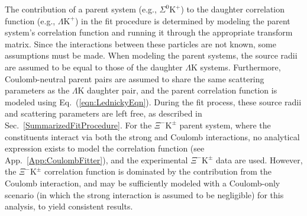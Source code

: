 \documentclass[ALICE,manyauthors]{cernphprep}
\newcommand{\KchP}{$\mathrm{K^{+}}$\xspace}
\newcommand{\LamK}{$\Lambda$K\xspace}
\newcommand{\LamKchP}{$\Lambda\mathrm{K^{+}}$\xspace}
\newcommand{\XiKpm}{$\Xi^{-}\mathrm{K^{\pm}}$\xspace}
\begin{document}
The contribution of a parent system (e.g., $\Sigma^{0}$\KchP) to the daughter correlation function (e.g., \LamKchP) in the fit procedure is determined by modeling the parent system's correlation function and running it through the appropriate transform matrix.
Since the interactions between these particles are not known, some assumptions must be made.
When modeling the parent systems, the source radii are assumed to be equal to those of the daughter \LamK systems.
Furthermore, Coulomb-neutral parent pairs are assumed to share the same scattering parameters as the \LamK daughter pair, and the parent correlation function is modeled using Eq.~(\ref{eqn:LednickyEqn}).
During the fit process, these source radii and scattering parameters are left free, as described in Sec.~\ref{SummarizedFitProcedure}.
For the \XiKpm parent system, where the constituents interact via both the strong and Coulomb interactions, no analytical expression exists to model the correlation function (see App.~\ref{App:CoulombFitter}), and the experimental \XiKpm data are used.
However, the \XiKpm correlation function is dominated by the contribution from the Coulomb interaction, and may be sufficiently modeled with a Coulomb-only scenario (in which the strong interaction is assumed to be negligible) for this analysis, to yield consistent results.
\end{document}
